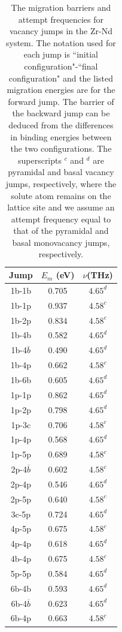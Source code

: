 \documentclass[preprint,12pt]{elsarticle}
\begin{document}
\begin{table}[h!]
    \centering
    \caption{The migration barriers and attempt frequencies for vacancy jumps in the Zr-Nd system. The notation used for each jump is ``initial configuration"-``final configuration" and the listed migration energies are for the forward jump. The barrier of the backward jump can be deduced from the differences in binding energies between the two configurations. The superscripts $^c$ and $^d$ are pyramidal and basal vacancy jumps, respectively, where the solute atom remains on the lattice site and we assume an attempt frequency equal to that of the pyramidal and basal monovacancy jumps, respectively.}
    \begin{tabular}{c|c|c}
    \toprule
        Jump&$E_m$ (eV) & $\nu$(THz)  \\
        \hline
       1b-1b &0.705 &$4.65^d$  \\
       1b-1p &0.937 &$4.58^c$ \\
       1b-2p &0.834 & $4.58^c$\\
       1b-4b &0.582 & $4.65^d$\\
       1b-4$\overline{b}$ &0.490 & $4.65^d$\\
       1b-4p &0.662 & $4.58^c$\\
       1b-6b &0.605 & $4.65^d$\\
       1p-1p &0.862 & $4.65^d$\\
       1p-2p &0.798 & $4.65^d$\\
       1p-3c &0.706 & $4.58^c$\\
       1p-4p &0.568 & $4.65^d$\\
       1p-5p &0.689 & $4.58^c$\\ 
       2p-4$\overline{b}$ &0.602 & $4.58^c$\\
       2p-4p &0.546 & $4.65^d$\\
       2p-5p &0.640 & $4.58^c$\\
       3c-5p &0.724 & $4.65^d$\\
       4p-5p &0.675 & $4.58^c$\\
       4p-4p &0.618 & $4.65^d$ \\
       4b-4p &0.675 & $4.58^c$\\
       5p-5p &0.584 & $4.65^d$\\
       6b-4b &0.593 &$4.65^d$ \\
       6b-4$\overline{b}$ &0.623 &$4.65^d$ \\
       6b-4p &0.663 & $4.58^c$\\
       \bottomrule
    \end{tabular}
    \label{tab:jumps_vac_nd}
\end{table}
\end{document}
